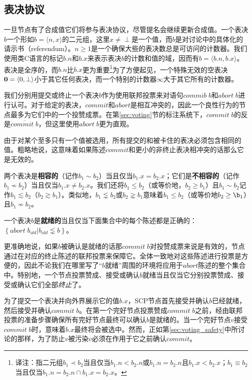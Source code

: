 \subsection{表决协议}
一旦节点有了合成值它们将参与表决协议，尽管提名会继续更新合成值。一个表决$b$一个形如$b=\langle n,x\rangle$的二元组，这里$x\neq \perp$是一个值，而$b$是对讨论中的{\slot}具体化的请示书（referendum）。$n\geq 1$是一个确保大些的表决数总是可访问的计数器。我们使用类C语言的标记$b.n$和$b.x$来表示表决$b$的计数和值的域，因而有$b=\langle b.n, b.x\rangle$。表决是全序的，而$b.n$比$b.x$更为重要{\footnote{译注：指二元组$b_1\prec b_2$当且仅当$b_1.n < b_2.n$或$b_1.n=b_2.n $且$b_1.x < b_2.x$；$b_1\equiv b_2$当且仅当$b_1.n=b_2.n\cap b_1.x=b_2.x$。}}为了方便起见，一个特殊无效的空表决${\bm 0}=\langle 0,\perp\rangle$小于其它任何表决，而一个特别的计数器$\infty$大于其它所有的计数器。

我们分别用提交或终止一个表决$b$作为使用联邦投票来对语句$commib\;b$和$abort\;b$进行认可。对于给定的表决，$commit$和$abort$是相互冲突的，因此一个良性行为的节点最多为它们中的一个投赞成票。在第\ref{sec:voting}节的标注系统下，$commit\;b$的反是$\overline{commit\;b}$，但这里使用$abort\;b$更为直观。

由于对某个{\slot}至多只有一个值被选用，所有提交的和被卡住的表决必须包含相同的值。粗略地说，这意味着如果陈述$commit$和更小的非终止表决相冲突的话那么它是无效的。

\begin{definition}[相容的]
        两个表决是\textbf{相容的}（记作$b_1 \sim b_2$）当且仅当$b_1.x=b_2.x$；它们是\textbf{不相容的}（记作$b_1\not\sim b_2$）当且仅当$b_1.x\neq b_2.x$。我们还将$b_1\leq b_2$（或等价地，$b_2\geq b_1$）且$b_1\sim b_2$记作$b_1\lesssim b_2$（$b_2\gtrsim b_1$）。类似地，$b_1\lnsim b_2$或$b_2\gnsim b_1$意味着$b_1\leq b_2$（或等价地$b_2\geq \b_1$）且$b_1\not\sim b_2$。
\end{definition}

\begin{definition}[就绪的]
        一个表决$b$是\textbf{就绪的}当且仅当下面集合中的每个陈述都是正确的：$\left\{abort\;b_{old}|b_{old}\lnsim b\right\}$。
\end{definition}

更准确地说，如果$b$被确认是就绪的话那$commit\;b$对投赞成票来说是有效的，节点通过在对应的终止陈述的联邦投票来保障它。全体一致地对这些陈述进行投票是方便的，因此不论我们在哪里写了``$b$就绪''周围的环境将应用于$abort$陈述的整个集合中。特别地，一个节点投票赞成、接受或确认$b$就绪当且仅当它分别投票赞成、接受或确认它们全部\textit{终止}了。

为了提交一个表决并向外界展示它的值$b.x$，SCP节点首先接受并确认$b$已经就绪，然后接受并确认$commit\;b$。在第一个完好节点投票赞成$commit\;b$之前，经由联邦投票的准备步骤确保所有完好节点最终可以确认$b$是就绪的。当一个完好节点$v$接受$commit\;b$时，意味着$b.x$最终将会被选中。然而，正如第\ref{sec:voting_safety}中所讨论的那样，为了防止$v$被污染$v$必须在作用于它之前确认$commit$。


